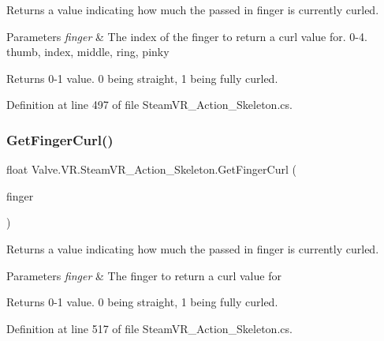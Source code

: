 Returns a value indicating how much the passed in finger is currently curled. 


\begin{DoxyParams}{Parameters}
{\em finger} & The index of the finger to return a curl value for. 0-\/4. thumb, index, middle, ring, pinky\\
\hline
\end{DoxyParams}
\begin{DoxyReturn}{Returns}
0-\/1 value. 0 being straight, 1 being fully curled.
\end{DoxyReturn}


Definition at line 497 of file Steam\+V\+R\+\_\+\+Action\+\_\+\+Skeleton.\+cs.

\mbox{\label{class_valve_1_1_v_r_1_1_steam_v_r___action___skeleton_a8263bb3bd140f1c795c7dfa82ed23557}} 
\subsubsection{\texorpdfstring{GetFingerCurl()}{GetFingerCurl()}\hspace{0.1cm}{\footnotesize\ttfamily [2/2]}}
{\footnotesize\ttfamily float Valve.\+V\+R.\+Steam\+V\+R\+\_\+\+Action\+\_\+\+Skeleton.\+Get\+Finger\+Curl (\begin{DoxyParamCaption}\item[{\mbox{\hyperlink{namespace_valve_1_1_v_r_ac40c4bdf0a3dcd6e69cad2d85f287c67}{Steam\+V\+R\+\_\+\+Skeleton\+\_\+\+Finger\+Index\+Enum}}}]{finger }\end{DoxyParamCaption})}



Returns a value indicating how much the passed in finger is currently curled. 


\begin{DoxyParams}{Parameters}
{\em finger} & The finger to return a curl value for\\
\hline
\end{DoxyParams}
\begin{DoxyReturn}{Returns}
0-\/1 value. 0 being straight, 1 being fully curled.
\end{DoxyReturn}


Definition at line 517 of file Steam\+V\+R\+\_\+\+Action\+\_\+\+Skeleton.\+cs.

